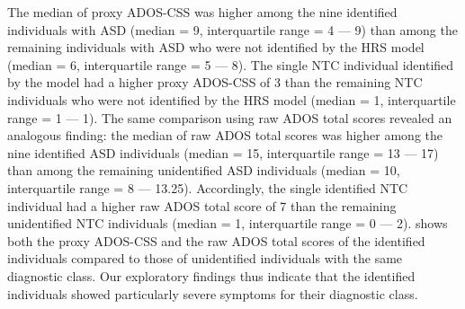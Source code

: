 \documentclass[9pt,lineno]{elife}
\begin{document}
The median of proxy ADOS-CSS was higher among the nine identified individuals with ASD (median = 9, interquartile range = 4 --- 9) than among the remaining individuals with ASD who were not identified by the HRS model (median = 6, interquartile range = 5 --- 8). The single NTC individual identified by the model had a higher proxy ADOS-CSS of 3 than the remaining NTC individuals who were not identified by the HRS model (median = 1, interquartile range = 1 --- 1). The same comparison using raw ADOS total scores revealed an analogous finding: the median of raw ADOS total scores was higher among the nine identified ASD individuals (median = 15, interquartile range = 13 --- 17) than among the remaining unidentified ASD individuals (median = 10, interquartile range = 8 --- 13.25). Accordingly, the single identified NTC individual had a higher raw ADOS total score of 7 than the remaining unidentified NTC individuals (median = 1, interquartile range = 0 --- 2).   shows both the proxy ADOS-CSS and the raw ADOS total scores of the identified individuals compared to those of unidentified individuals with the same diagnostic class. Our exploratory findings thus indicate that the identified individuals showed particularly severe symptoms for their diagnostic class.
\end{document}
